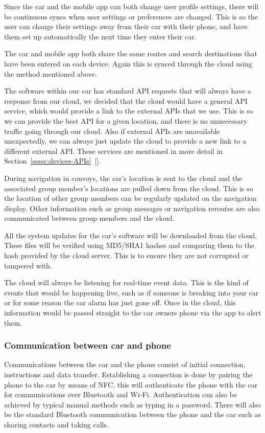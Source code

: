 \documentclass{article}
\begin{document}
Since the car and the mobile app can both change user profile settings, there will be continuous syncs when user settings or preferences are changed. This is so the user can change their settings away from their car with their phone, and have them set up automatically the next time they enter their car.

The car and mobile app both share the same routes and search destinations that have been entered on each device. Again this is synced through the cloud using the method mentioned above.

The software within our car has standard API requests that will always have a response from our cloud, we decided that the cloud would have a general API service, which would provide a link to the external APIs that we use. This is so we can provide the best API for a given location, and there is no unnecessary traffic going through our cloud. Also if external APIs are unavailable unexpectedly, we can always just update the cloud to provide a new link to a different external API\@. These services are mentioned in more detail in Section~\ref{sssec:devices-APIs}~[].

During navigation in convoys, the car's location is sent to the cloud and the associated group member's locations are pulled down from the cloud. This is so the location of other group members can be regularly updated on the navigation display. Other information such as group messages or navigation reroutes are also communicated between group members and the cloud.

All the system updates for the car's software will be downloaded from the cloud. These files will be verified using MD5/SHA1 hashes and comparing them to the hash provided by the cloud server. This is to ensure they are not corrupted or tampered with.

The cloud will always be listening for real-time event data. This is the kind of events that would be happening live, such as if someone is breaking into your car or for some reason the car alarm has just gone off. Once in the cloud, this information would be passed straight to the car owners phone via the app to alert them.

\subsubsection{Communication between car and phone}\label{sssec:car-phone}
Communications between the car and the phone consist of initial connection, instructions and data transfer. Establishing a connection is done by pairing the phone to the car by means of NFC, this will authenticate the phone with the car for communications over Bluetooth and Wi-Fi. Authentication can also be achieved by typical manual methods such as typing in a password. There will also be the standard Bluetooth communication between the phone and the car such as sharing contacts and taking calls.
\end{document}
